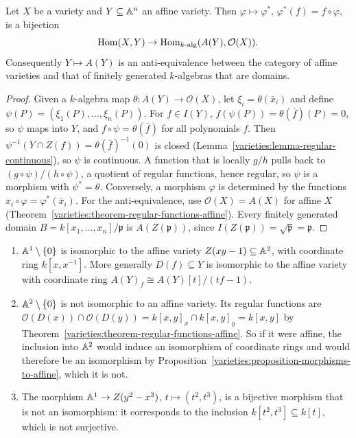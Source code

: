 \begin{proposition}\label{varieties:proposition-morphisms-to-affine}
Let $X$ be a variety and $Y \subseteq \mathbb{A}^n$ an affine variety. Then $\varphi \mapsto \varphi^*$, $\varphi^*(f) = f \circ \varphi$, is a bijection
\[
\operatorname{Hom}(X, Y) \to \operatorname{Hom}_{k\text{-alg}}(A(Y), \mathcal{O}(X)).
\]
Consequently $Y \mapsto A(Y)$ is an anti-equivalence between the category of affine varieties and that of finitely generated
$k$-algebras that are domains.
\end{proposition}

\begin{proof}
Given a $k$-algebra map $\theta \colon A(Y) \to \mathcal{O}(X)$, let $\xi_i = \theta(\bar x_i)$ and define $\psi(P) = (\xi_1(P), \ldots, \xi_n(P))$.
For $f \in I(Y)$, $f(\psi(P)) = \theta(\bar f)(P) = 0$, so $\psi$ maps into $Y$, and $f \circ \psi = \theta(\bar f)$ for all polynomials $f$. Then
$\psi^{-1}(Y \cap Z(f)) = \theta(\bar f)^{-1}(0)$ is closed (Lemma~\ref{varieties:lemma-regular-continuous}), so $\psi$ is continuous. A function
that is locally $g/h$ pulls back to $(g \circ \psi)/(h \circ \psi)$, a quotient of regular functions, hence regular, so $\psi$ is a morphism with
$\psi^* = \theta$. Conversely, a morphism $\varphi$ is determined by the functions $x_i \circ \varphi = \varphi^*(\bar x_i)$. For the
anti-equivalence, use $\mathcal{O}(X) = A(X)$ for affine $X$ (Theorem~\ref{varieties:theorem-regular-functions-affine}). Every finitely generated
domain $B = k[x_1, \ldots, x_n]/\mathfrak{p}$ is $A(Z(\mathfrak{p}))$, since $I(Z(\mathfrak{p})) = \sqrt{\mathfrak{p}} = \mathfrak{p}$.
\end{proof}

\begin{example}\label{varieties:example-morphisms}
\begin{enumerate}
\item $\mathbb{A}^1 \setminus \{0\}$ is isomorphic to the affine variety $Z(xy - 1) \subseteq \mathbb{A}^2$, with coordinate ring $k[x, x^{-1}]$. More generally
$D(f) \subseteq Y$ is isomorphic to the affine variety with coordinate ring $A(Y)_f \cong A(Y)[t]/(tf - 1)$.
\item $\mathbb{A}^2 \setminus \{0\}$ is not isomorphic to an affine variety. Its regular functions are
$\mathcal{O}(D(x)) \cap \mathcal{O}(D(y)) = k[x, y]_x \cap k[x, y]_y = k[x, y]$ by Theorem~\ref{varieties:theorem-regular-functions-affine}. So if it were
affine, the inclusion into $\mathbb{A}^2$ would induce an isomorphism of coordinate rings and would therefore be an isomorphism by
Proposition~\ref{varieties:proposition-morphisms-to-affine}, which it is not.
\item The morphism $\mathbb{A}^1 \to Z(y^2 - x^3)$, $t \mapsto (t^2, t^3)$, is a bijective morphism that is not an isomorphism: it corresponds to the
inclusion $k[t^2, t^3] \subseteq k[t]$, which is not surjective.
\end{enumerate}
\end{example}

